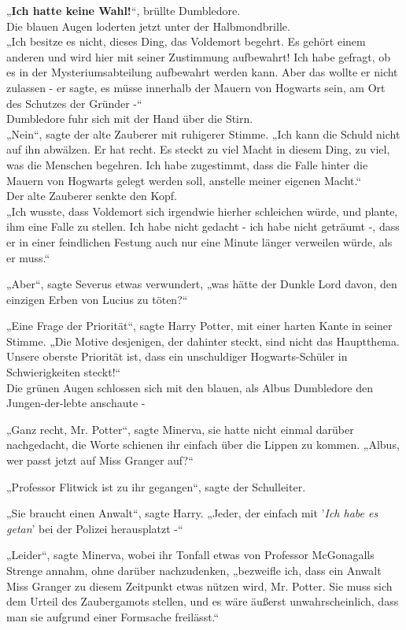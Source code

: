{„\textbf{Ich hatte keine Wahl!}“, brüllte Dumbledore.\\ Die blauen Augen loderten jetzt unter der Halbmondbrille.\\ „Ich besitze es nicht, dieses Ding, das Voldemort begehrt. Es gehört einem anderen und wird hier mit seiner Zustimmung aufbewahrt! Ich habe gefragt, ob es in der Mysteriumsabteilung aufbewahrt werden kann. Aber das wollte er nicht zulassen - er sagte, es müsse innerhalb der Mauern von Hogwarts sein, am Ort des Schutzes der Gründer -“\\ Dumbledore fuhr sich mit der Hand über die Stirn.\\ „Nein“, sagte der alte Zauberer mit ruhigerer Stimme. „Ich kann die Schuld nicht auf ihn abwälzen. Er hat recht. Es steckt zu viel Macht in diesem Ding, zu viel, was die Menschen begehren. Ich habe zugestimmt, dass die Falle hinter die Mauern von Hogwarts gelegt werden soll, anstelle meiner eigenen Macht.“\\ Der alte Zauberer senkte den Kopf.\\ „Ich wusste, dass Voldemort sich irgendwie hierher schleichen würde, und plante, ihm eine Falle zu stellen. Ich habe nicht gedacht - ich habe nicht geträumt -, dass er in einer feindlichen Festung auch nur eine Minute länger verweilen würde, als er muss.“

„Aber“, sagte Severus etwas verwundert, „was hätte der Dunkle Lord davon, den einzigen Erben von Lucius zu töten?“

„Eine Frage der Priorität“, sagte Harry Potter, mit einer harten Kante in seiner Stimme. „Die Motive desjenigen, der dahinter steckt, sind nicht das Hauptthema. Unsere oberste Priorität ist, dass ein unschuldiger Hogwarts-Schüler in Schwierigkeiten steckt!“\\ Die grünen Augen schlossen sich mit den blauen, als Albus Dumbledore den Jungen-der-lebte anschaute -

„Ganz recht, Mr. Potter“, sagte Minerva, sie hatte nicht einmal darüber nachgedacht, die Worte schienen ihr einfach über die Lippen zu kommen. „Albus, wer passt jetzt auf Miss Granger auf?“

„Professor Flitwick ist zu ihr gegangen“, sagte der Schulleiter.

„Sie braucht einen Anwalt“, sagte Harry. „Jeder, der einfach mit '\emph{Ich habe es getan}' bei der Polizei herausplatzt -“

„Leider“, sagte Minerva, wobei ihr Tonfall etwas von Professor McGonagalls Strenge annahm, ohne darüber nachzudenken, „bezweifle ich, dass ein Anwalt Miss Granger zu diesem Zeitpunkt etwas nützen wird, Mr. Potter. Sie muss sich dem Urteil des Zaubergamots stellen, und es wäre äußerst unwahrscheinlich, dass man sie aufgrund einer Formsache freilässt.“

}
